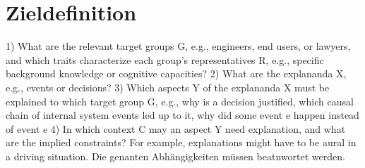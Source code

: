 \section{Zieldefinition}

1) What are the relevant target groups G, e.g., engineers, end users, or lawyers, and which traits characterize each group’s representatives R, e.g., specific background knowledge or cognitive capacities? 2) What are the explananda X, e.g., events or decisions? 3) Which aspects Y of the explananda X must be explained to which target group G, e.g., why is a decision justified, which causal chain of internal system events led up to it, why did some event e happen instead of event e 4) In which context C may an aspect Y need explanation, and what are the implied constraints? For example, explanations might have to be aural in a driving situation. \cite{kohl_explainability_2019} Die genanten Abhängigkeiten müssen beatnwortet werden.